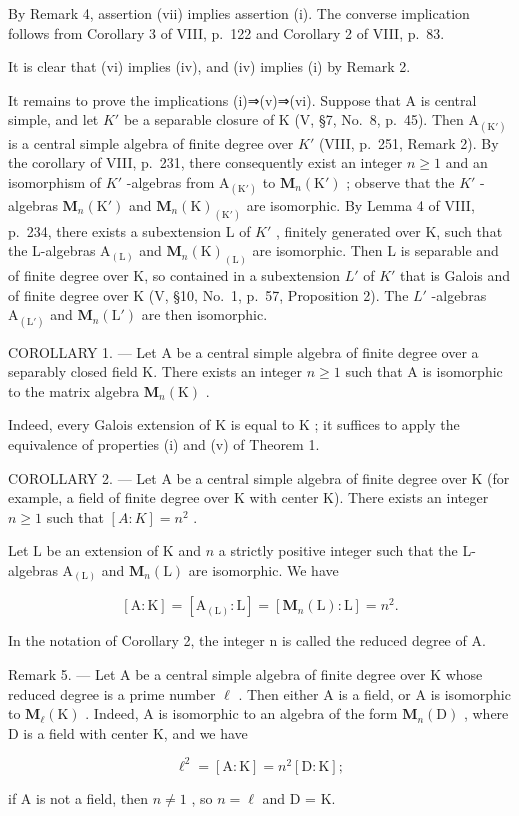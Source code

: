 By Remark 4, assertion (vii) implies assertion (i). The converse implication follows from Corollary 3 of VIII, p.~122 and Corollary 2 of VIII, p.~83.

It is clear that (vi) implies (iv), and (iv) implies (i) by Remark 2.

It remains to prove the implications (i)⇒(v)⇒(vi). Suppose that A is central simple, and let \(K'\) be a separable closure of K (V, §7, No.~8, p.~45). Then \(\mathrm{A}_{(\mathrm{K}')}\) is a central simple algebra of finite degree over \(K'\) (VIII, p.~251, Remark 2). By the corollary of VIII, p.~231, there consequently exist an integer \(n \geqslant 1\) and an isomorphism of \(K'\) -algebras from \(\mathrm{A}_{(\mathrm{K}')}\) to \(\mathbf{M}_{n}(\mathrm{K}')\) ; observe that the \(K'\) -algebras \(\mathbf{M}_{n}(\mathrm{K}')\) and \(\mathbf{M}_{n}(\mathrm{K})_{(\mathrm{K}')}\) are isomorphic. By Lemma 4 of VIII, p.~234, there exists a subextension L of \(K'\) , finitely generated over K, such that the L-algebras \(\mathrm{A}_{(\mathrm{L})}\) and \(\mathbf{M}_{n}(\mathrm{K})_{(\mathrm{L})}\) are isomorphic. Then L is separable and of finite degree over K, so contained in a subextension \(L'\) of \(K'\) that is Galois and of finite degree over K (V, §10, No.~1, p.~57, Proposition 2). The \(L'\) -algebras \(\mathrm{A}_{(\mathrm{L}')}\) and \(\mathbf{M}_{n}(\mathrm{L}')\) are then isomorphic.

COROLLARY 1. --- Let A be a central simple algebra of finite degree over a separably closed field K. There exists an integer \(n \geqslant 1\) such that A is isomorphic to the matrix algebra \(\mathbf{M}_{n}(\mathrm{K})\) .

Indeed, every Galois extension of \(\mathrm{K}\) is equal to \(\mathrm{K}\) ; it suffices to apply the equivalence of properties (i) and (v) of Theorem 1.

COROLLARY 2. --- Let A be a central simple algebra of finite degree over K (for example, a field of finite degree over K with center K). There exists an integer \(n \geqslant 1\) such that \([A : K] = n^{2}\) .

Let \(\mathrm{L}\) be an extension of \(\mathrm{K}\) and \(n\) a strictly positive integer such that the L-algebras \(\mathrm{A}_{(\mathrm{L})}\) and \(\mathbf{M}_n(\mathrm{L})\) are isomorphic. We have

\[
[ \mathrm{A}: \mathrm{K} ] = [ \mathrm{A} _ {(\mathrm{L})}: \mathrm{L} ] = [ \mathbf {M} _ {n} (\mathrm{L}): \mathrm{L} ] = n ^ {2}.
\]

In the notation of Corollary 2, the integer n is called the reduced degree of A.

Remark 5. --- Let A be a central simple algebra of finite degree over K whose reduced degree is a prime number \(\ell\) . Then either A is a field, or A is isomorphic to \(\mathbf{M}_{\ell}(\mathrm{K})\) . Indeed, A is isomorphic to an algebra of the form \(\mathbf{M}_{n}(\mathrm{D})\) , where D is a field with center K, and we have

\[
\ell^ {2} = [ \mathrm{A}: \mathrm{K} ] = n ^ {2} [ \mathrm{D}: \mathrm{K} ];
\]

if A is not a field, then \(n \neq 1\) , so \(n = \ell\) and D = K.

